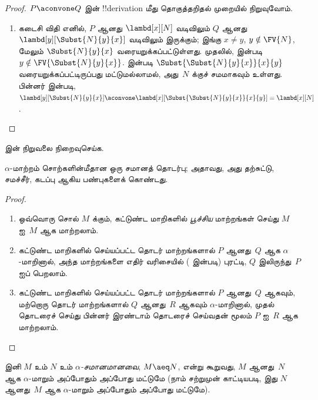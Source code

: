\documentclass[../../../include/open-logic-section]{subfiles}
\begin{document}
\begin{proof}
  $P \aconvone Q$ இன் !!{derivation} மீது தொகுத்தறிதல் முறையில் நிறுவுவோம்.
  \begin{enumerate}
  \item கடைசி விதி  எனில், $P$ ஆனது
    $\lambd[x][N]$ வடிவிலும் $Q$ ஆனது
    $\lambd[y][\Subst{N}{y}{x}]$ வடிவிலும் இருக்கும்; இங்கு $x \neq y$,
    $y \notin \FV{N}$, மேலும் $\Subst{N}{y}{x}$ வரையறுக்கப்பட்டுள்ளது.
    முதலில்,  இன்படி $y \notin
    \FV{\Subst{N}{y}{x}}$.  இன்படி
    $\Subst{\Subst{N}{y}{x}}{x}{y}$ வரையறுக்கப்பட்டிருப்பது மட்டுமல்லாமல்,
    அது~$N$ க்குச் சமமாகவும் உள்ளது. பின்னர்  இன்படி,
    $\lambd[y][\Subst{N}{y}{x}]
    \aconvone \lambd[x][\Subst{\Subst{N}{y}{x}}{x}{y}] =
    \lambd[x][N]$.
  \end{enumerate}
\end{proof}

\begin{prob}
   இன் நிறுவலை நிறைவுசெய்க.
\end{prob}

\begin{thm}
  $\alpha$-மாற்றம் சொற்களின்மீதான ஒரு சமானத் தொடர்பு; அதாவது, அது தற்சுட்டு,
  சமச்சீர், கடப்பு ஆகிய பண்புகளைக் கொண்டது.
\end{thm}

\begin{proof}
  \begin{enumerate}
  \item ஒவ்வொரு சொல் $M$ க்கும், கட்டுண்ட மாறிகளில் \emph{பூச்சிய} மாற்றங்கள்
    செய்து $M$ ஐ~$M$ ஆக மாற்றலாம்.
  \item கட்டுண்ட மாறிகளில் செய்யப்பட்ட தொடர் மாற்றங்களால் $P$ ஆனது~$Q$ ஆக
    $\alpha$-மாறினால், அந்த மாற்றங்களை எதிர் வரிசையில்
    ( இன்படி) புரட்டி, $Q$ இலிருந்து~$P$ ஐப் பெறலாம்.
  \item கட்டுண்ட மாறிகளில் செய்யப்பட்ட தொடர் மாற்றங்களால் $P$ ஆனது~$Q$ ஆகவும்,
    மற்றொரு தொடர் மாற்றங்களால் $Q$ ஆனது~$R$ ஆகவும் $\alpha$-மாறினால், முதல்
    தொடரைச் செய்து பின்னர் இரண்டாம் தொடரைச் செய்வதன் மூலம் $P$ ஐ~$R$ ஆக
    மாற்றலாம்.
  \end{enumerate}
\end{proof}

இனி $M$ உம் $N$ உம் \emph{$\alpha$-சமானமானவை}, $M \aeq N$, என்று கூறுவது,
$M$ ஆனது~$N$ ஆக $\alpha$-மாறும் அப்போதும் அப்போது மட்டுமே (நாம் சற்றுமுன்
காட்டியபடி, இது $N$ ஆனது~$M$ ஆக $\alpha$-மாறும் அப்போதும் அப்போது மட்டுமே).
\end{document}
